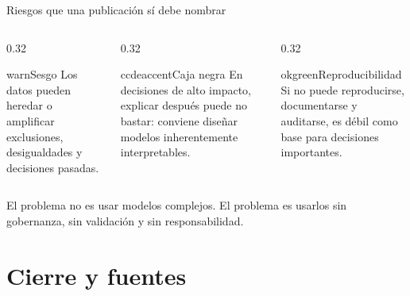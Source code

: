 \documentclass[aspectratio=169,11pt,table]{beamer}
\begin{document}
\begin{frame}{Riesgos que una publicación sí debe nombrar}
\begin{columns}[T,onlytextwidth]
\begin{column}{0.32\textwidth}
\begin{contrastbox}{warn}{Sesgo}
\small
Los datos pueden heredar o amplificar exclusiones, desigualdades y decisiones pasadas.
\end{contrastbox}
\end{column}
\begin{column}{0.32\textwidth}
\begin{contrastbox}{ccdeaccent}{Caja negra}
\small
En decisiones de alto impacto, explicar después puede no bastar: conviene diseñar modelos inherentemente interpretables.
\end{contrastbox}
\end{column}
\begin{column}{0.32\textwidth}
\begin{contrastbox}{okgreen}{Reproducibilidad}
\small
Si no puede reproducirse, documentarse y auditarse, es débil como base para decisiones importantes.
\end{contrastbox}
\end{column}
\end{columns}

\vspace{0.45cm}
\begin{keybox}
\centering
El problema no es usar modelos complejos. El problema es usarlos sin gobernanza, sin validación y sin responsabilidad.
\end{keybox}

\end{frame}

\section{Cierre y fuentes}
\end{document}
